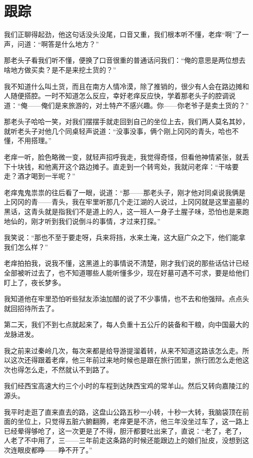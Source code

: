 \chapter{跟踪}

我们正聊得起劲，他这句话没头没尾，口音又重，我们根本听不懂，老痒“啊”了一声，问道：“啊答是什么地方？”

那老头子看我们听不懂，便换了口音很重的普通话问我们：“俺的意思是两位想去啥地方做买卖？是不是来挖土货的？”

我不知道什么叫土货，而且在南方人情冷漠，除了推销的，很少有人会在路边摊和人随便搭腔。一时不知道怎么反应，幸好老痒反应快，学着那老头子的腔调说道：“俺——俺们是来旅游的，对土特产不感兴趣。你——你老爷子是卖土货的？”

那老头子哈哈一笑，对我们摆摆手就走回到自己的坐位上去，我们两人莫名其妙，就听老头子对他几个同桌轻声说道：“没事没事，俩个刚上冈冈的青头，哈也不懂，不用搭理。”

老痒一听，脸色略微一变，就轻声招呼我走，我觉得奇怪，但看他神情紧张，就丢下十块钱，和他离开这个路边摊子。直走到一个转弯处，我就问老痒：“干啥要走？酒才喝到一半呢？”

老痒鬼鬼祟祟的往后看了一眼，说道：“那——那老头子，刚才他对同桌说我俩是上冈冈的青——青头，我在牢里听那几个走江湖的人说过，上冈冈就是这里盗墓的黑话，这青头就是指我们不是道上的人，这一班人一身子土腥子味，恐怕也是来跑地仙的，刚才听到我们说倒斗的事情，才过来打探。”

我笑说：“那也不至于要走呀，兵来将挡，水来土淹，这大庭广众之下，他们能拿我们怎么样？”

老痒拍拍我，说我不懂，这黑道上的事情说不清楚，刚才我们说的那些话估计已经全部被听过去了，也不知道哪些人能听懂多少，现在好墓可遇不可求，要是给他们盯上了，夜长梦多。

我知道他在牢里恐怕听些狱友添油加醋的说了不少事情，也不去和他强辩。点点头就回招待所去了。

第二天，我们不到七点就起来了，每人负重十五公斤的装备和干粮，向中国最大的龙脉进发。

我之前来过秦岭几次，每次来都是给导游提溜着转，从来不知道这路该怎么走。所以这次还得跟着老痒，他三年前过来地时候也是跟在旅行团里，旅行团怎么走他这次也得怎么走，不然就认不到路了。

我们经西宝高速大约三个小时的车程到达陕西宝鸡的常羊山。然后又转向嘉陵江的源头。

我平时走逛了直来直去的路，这盘山公路五秒一小转，十秒一大转，我脑袋顶在前面的坐位上，只觉得五脏六腑翻腾，老痒更是不济，他三年没坐过车了，这一路上已经晕得够呛了，这一次更是了不得，胆汗都要吐出来了，直说：“老了，老了，人老了不中用了，三——三年前走这条路的时候还能跟边上的娘们扯皮，没想到这次连眼皮都睁——睁不开了。”

